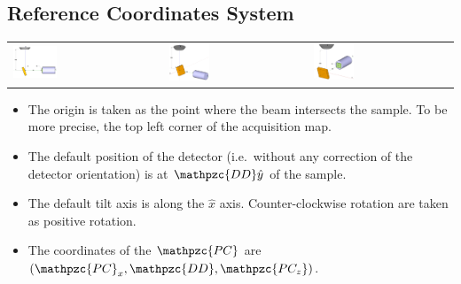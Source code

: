 \documentclass[letterpaper]{article}
\newcommand{\vx}{\hat{x}}
\newcommand{\vy}{\hat{y}}
\newcommand{\var}[1]{\mathpzc{#1}}
\begin{document}
	\subsection{Reference Coordinates System}
		\begin{tabular}{p{}p{}p{}}
			\includegraphics[width=0.3\textwidth]{figures/axis_system1} & \includegraphics[width=0.3\textwidth]{figures/axis_system2} & \includegraphics[width=0.3\textwidth]{figures/axis_system3} 
		\end{tabular}
		\begin{itemize}
			\item The origin is taken as the point where the beam intersects the sample. To be more precise, the top left corner of the acquisition map.
			\item The default position of the detector (i.e.\ without any correction of the detector orientation) is at $\var{DD}\vy$ of the sample.
			\item The default tilt axis is along the $\vx$ axis. Counter-clockwise rotation are taken as positive rotation.
			\item The coordinates of the $\var{PC}$ are $(\var{PC}_x, \var{DD}, \var{PC_z})$.
		\end{itemize}
	
\end{document}
